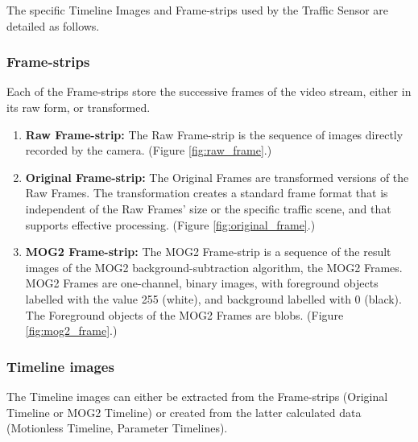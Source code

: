 The specific Timeline Images and Frame-strips used by the Traffic Sensor are detailed as follows.

\subsubsection{Frame-strips}
Each of the Frame-strips store the successive frames of the video stream, either in its raw form, or transformed.
\begin{enumerate}
	\item \textbf{Raw Frame-strip:} The Raw Frame-strip is the sequence of images directly recorded by the camera. (Figure \ref{fig:raw_frame}.)
	
	\item \textbf{Original Frame-strip:} The Original Frames are transformed versions of the Raw Frames. The transformation creates a standard frame format that is independent of the Raw Frames' size or the specific traffic scene, and that supports effective processing. (Figure \ref{fig:original_frame}.)
	
	\item \textbf{MOG2 Frame-strip:} The MOG2 Frame-strip is a sequence of the result images of the MOG2 background-subtraction algorithm, the MOG2 Frames. MOG2 Frames are one-channel, binary images, with foreground objects labelled with the value 255 (white), and background labelled with 0 (black). The Foreground objects of the MOG2 Frames are blobs. (Figure \ref{fig:mog2_frame}.)
\end{enumerate}

\subsubsection{Timeline images}
The Timeline images can either be extracted from the Frame-strips (Original Timeline or MOG2 Timeline) or created from the latter calculated data (Motionless Timeline, Parameter Timelines).

